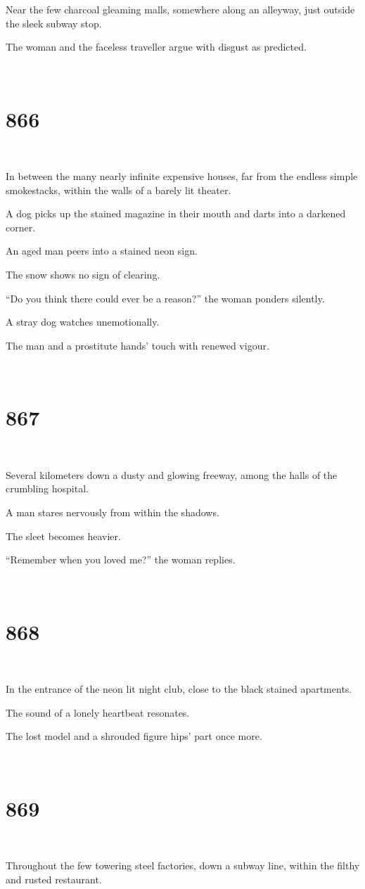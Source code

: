 \documentclass{report}
\begin{document}
Near the few charcoal gleaming malls, somewhere along an alleyway, just outside the sleek subway stop.

The woman and the faceless traveller argue with disgust as predicted.

~
\chapter*{866}
~

In between the many nearly infinite expensive houses, far from the endless simple smokestacks, within the walls of a barely lit theater.

A dog picks up the stained magazine in their mouth and darts into a darkened corner.

An aged man peers into a stained neon sign.

The snow shows no sign of clearing.

``Do you think there could ever be a reason?'' the woman ponders silently.

A stray dog watches unemotionally.

The man and a prostitute hands' touch with renewed vigour.

~
\chapter*{867}
~

Several kilometers down a dusty and glowing freeway, among the halls of the crumbling hospital.

A man stares nervously from within the shadows.

The sleet becomes heavier.

``Remember when you loved me?'' the woman replies.

~
\chapter*{868}
~

In the entrance of the neon lit night club, close to the black stained apartments.

The sound of a lonely heartbeat resonates.

The lost model and a shrouded figure hips' part once more.

~
\chapter*{869}
~

Throughout the few towering steel factories, down a subway line, within the filthy and rusted restaurant.
\end{document}

